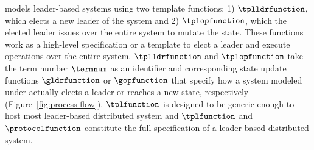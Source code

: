 
\sysname{} models leader-based systems using two template functions:
1) $\tplldrfunction$, which elects a new leader of the system and
2) $\tplopfunction$, which the elected leader issues over the entire system
to mutate the state. These functions work as a high-level specification or a
template to elect a leader and execute operations over the entire system.
$\tplldrfunction$ and $\tplopfunction$ take the term number $\termnum$ as an identifier
and corresponding state update functions $\gldrfunction$ or
$\gopfunction$ that specify how a system modeled under \sysname{}
actually elects a leader or reaches a new state, respectively (Figure~\ref{fig:process-flow}).
$\tplfunction$ is designed to be generic enough to host most
leader-based distributed system and $\tplfunction$ and $\protocolfunction$
constitute the full specification of a leader-based distributed system.


%

